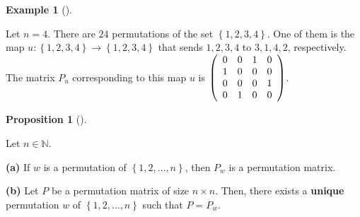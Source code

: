 \documentclass[numbers=enddot,12pt,final,onecolumn,notitlepage]{scrartcl}%
\theoremstyle{definition}
\newtheorem{prop}[theo]{Proposition}
\newenvironment{proposition}[1][]
{\begin{prop}[#1]\begin{leftbar}}
{\end{leftbar}\end{prop}}
\newtheorem{exam}[theo]{Example}
\newenvironment{example}[1][]
{\begin{exam}[#1]\begin{leftbar}}
{\end{leftbar}\end{exam}}
\begin{document}
\begin{example}
Let $n=4$. There are $24$ permutations of the set $\left\{  1,2,3,4\right\}
$. One of them is the map $u:\left\{  1,2,3,4\right\}  \rightarrow\left\{
1,2,3,4\right\}  $ that sends $1,2,3,4$ to $3,1,4,2$, respectively. The matrix
$P_{u}$ corresponding to this map $u$ is $\left(
\begin{array}
[c]{cccc}%
0 & 0 & 1 & 0\\
1 & 0 & 0 & 0\\
0 & 0 & 0 & 1\\
0 & 1 & 0 & 0
\end{array}
\right)  $.
\end{example}

\begin{proposition}
\label{prop.permat.permat-from-perm}Let $n\in\mathbb{N}$.

\textbf{(a)} If $w$ is a permutation of $\left\{  1,2,\ldots,n\right\}  $,
then $P_{w}$ is a permutation matrix.

\textbf{(b)} Let $P$ be a permutation matrix of size $n\times n$. Then, there
exists a \textbf{unique} permutation $w$ of $\left\{  1,2,\ldots,n\right\}  $
such that $P=P_{w}$.
\end{proposition}
\end{document}
